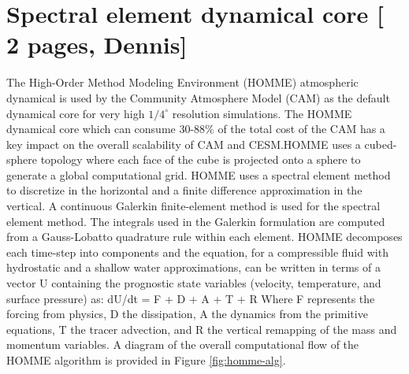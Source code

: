 
\section{Spectral element dynamical core  [{\color{red} 2 pages, Dennis}]}\label{sec:algorithm}


The High-Order Method Modeling Environment (HOMME) atmospheric dynamical is used by the Community Atmosphere Model (CAM) as the default dynamical core for very high $1/4^\circ$ resolution simulations.   The HOMME dynamical core which can consume 30-88\% of the total cost of the CAM has a key impact on the overall scalability of CAM and CESM.HOMME uses a cubed-sphere topology where each face of the cube is projected onto a sphere to generate a global computational grid.  HOMME uses a spectral element method to discretize in the horizontal and a finite difference approximation \cite{simmons:1981} in the vertical. A continuous Galerkin finite-element method \cite{taylor:1997} is used for the spectral element method. The integrals used in the Galerkin formulation are computed from a Gauss-Lobatto quadrature rule within each element.  HOMME decomposes each time-step into components and the equation, for a compressible fluid with hydrostatic and a shallow water approximations, can be written in terms of a vector U containing the prognostic state variables (velocity, temperature, and surface pressure) as: 
dU/dt = F + D + A + T + R
Where F represents the forcing from physics, D the dissipation, A the dynamics from the primitive equations, T the tracer advection, and R the vertical remapping of the mass and momentum variables. A diagram of the overall computational flow of the HOMME algorithm is provided in Figure \ref{fig:homme-alg}. 

